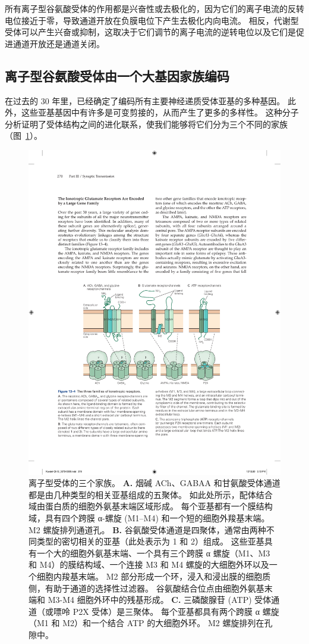 所有离子型谷氨酸受体的作用都是兴奋性或去极化的，因为它们的离子电流的反转电位接近于零，导致通道开放在负膜电位下产生去极化内向电流。
相反，代谢型受体可以产生兴奋或抑制，这取决于它们调节的离子电流的逆转电位以及它们是促进通道开放还是通道关闭。



\subsection{离子型谷氨酸受体由一个大基因家族编码}

在过去的 30 年里，已经确定了编码所有主要神经递质受体亚基的多种基因。
此外，这些亚基基因中有许多是可变剪接的，从而产生了更多的多样性。
这种分子分析证明了受体结构之间的进化联系，使我们能够将它们分为三个不同的家族（图~\ref{fig:13_4}）。


\begin{figure}[htbp]
	\centering
	\includegraphics[width=0.75\linewidth]{chap13/fig_13_4}
	\caption{离子型受体的三个家族。
		\textbf{A.} 烟碱 ACh、GABAA 和甘氨酸受体通道都是由几种类型的相关亚基组成的五聚体。
		如此处所示，配体结合域由蛋白质的细胞外氨基末端区域形成。
		每个亚基都有一个膜结构域，具有四个跨膜 α-螺旋 (M1–M4) 和一个短的细胞外羧基末端。
		M2 螺旋排列通道孔。
		\textbf{B.} 谷氨酸受体通道是四聚体，通常由两种不同类型的密切相关的亚基（此处表示为 1 和 2）组成。
		这些亚基具有一个大的细胞外氨基末端、一个具有三个跨膜 α 螺旋（M1、M3 和 M4）的膜结构域、一个连接 M3 和 M4 螺旋的大细胞外环以及一个细胞内羧基末端。
		M2 部分形成一个环，浸入和浸出膜的细胞质侧，有助于通道的选择性过滤器。
		谷氨酸结合位点由细胞外氨基末端和 M3-M4 细胞外环中的残基形成。
		\textbf{C.} 三磷酸腺苷 (ATP) 受体通道（或嘌呤 P2X 受体）是三聚体。
		每个亚基都具有两个跨膜 α 螺旋（M1 和 M2）和一个结合 ATP 的大细胞外环。 M2 螺旋排列在孔隙中。}
	\label{fig:13_4}
\end{figure}


